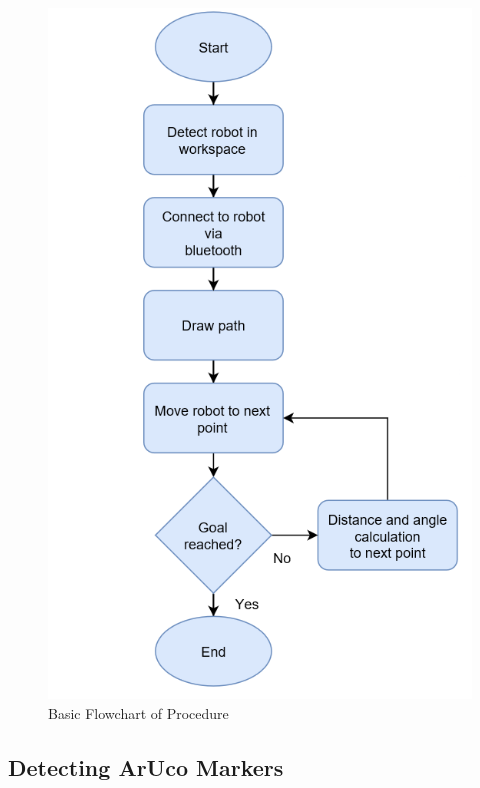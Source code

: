 \documentclass[12pt,american]{report}
\begin{document}
\begin{figure}[h!]
\centering
\includegraphics[scale=.5]{images/flowchart.PNG}
\caption{Basic Flowchart of Procedure}
\label{fig:flowchart}
\end{figure}


\subsection{Detecting ArUco Markers} 
\end{document}
